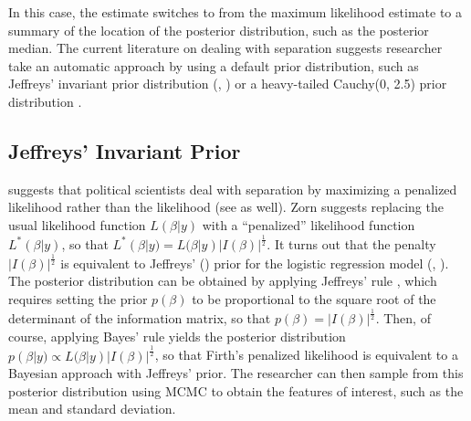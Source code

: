 \documentclass[12pt]{article}
\begin{document}
\noindent In this case, the estimate switches to from the maximum likelihood estimate to a summary of the location of the posterior distribution, such as the posterior median. The current literature on dealing with separation suggests researcher take an automatic approach by using a default prior distribution, such as Jeffreys' invariant prior distribution (\citealt{Jeffreys1946}, \citealt{Zorn2005}) or a heavy-tailed Cauchy(0, 2.5) prior distribution \citep{Gelmanetal2008}.

\subsection*{Jeffreys' Invariant Prior}

\cite{Zorn2005} suggests that political scientists deal with separation by maximizing a penalized likelihood rather than the likelihood (see \citealt{HeinzeSchemper2002} as well). Zorn suggests replacing the usual likelihood function $L(\beta | y)$ with a ``penalized'' likelihood function $L^*(\beta | y)$, so that $L^*(\beta | y) = L(\beta | y)|I(\beta)|^\frac{1}{2}$. It turns out that the penalty $|I(\beta)|^\frac{1}{2}$ is equivalent to Jeffreys' (\citeyear{Jeffreys1946}) prior for the logistic regression model (\citealt{Firth1993}, \citealt{Poirier1994}). The posterior distribution can be obtained by applying Jeffreys' rule \citep{Jeffreys1946}, which requires setting the prior $p(\beta)$ to be proportional to the square root of the determinant of the information matrix, so that $p(\beta) = |I(\beta)|^\frac{1}{2}$. Then, of course, applying Bayes' rule yields the posterior distribution $p(\beta | y) \propto L(\beta | y)|I(\beta)|^\frac{1}{2}$, so that Firth's penalized likelihood is equivalent to a Bayesian approach with Jeffreys' prior. The researcher can then sample from this posterior distribution using MCMC to obtain the features of interest, such as the mean and standard deviation.


\end{document}
